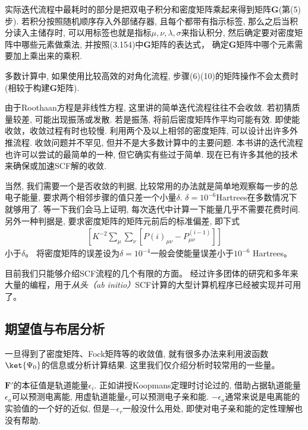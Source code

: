 实际迭代流程中最耗时的部分是把双电子积分和密度矩阵乘起来得到矩阵$\mathbf{G}$(第(5)步). 
若积分按照随机顺序存入外部储存器, 
且每个都带有指示标签, 
那么之后当积分读入主储存时, 
可以用标签也就是指标$\mu,\nu,\lambda,\sigma$来指认积分, 
然后确定要对密度矩阵中哪些元素做乘法, 
并按照(3.154)中$\mathbf{G}$矩阵的表达式， 
确定$\mathbf{G}$矩阵中哪个元素需要加上乘出来的乘积.


多数计算中, 
如果使用比较高效的对角化流程, 
步骤(6)(10)的矩阵操作不会太费时(相较于构建$\mathbf{G}$矩阵).


由于Roothaan方程是非线性方程, 
这里讲的简单迭代流程往往不会收敛. 
若初猜质量较差, 
可能出现振荡或发散. 
若是振荡, 
将前后密度矩阵作平均可能有效. 
即使能收敛，收敛过程有时也较慢. 
利用两个及以上相邻的密度矩阵, 
可以设计出许多外推流程. 
收敛问题并不罕见, 
但并不是大多数计算中的主要问题. 
本书讲的迭代流程也许可以尝试的最简单的一种, 
但它确实有些过于简单. 
现在已有许多其他的技术来确保或加速SCF解的收敛.


当然, 
我们需要一个是否收敛的判据, 
比较常用的办法就是简单地观察每一步的总电子能量, 
要求两个相邻步骤的值只差一个小量$\delta$. 
$\delta=10^{-6}$Hartrees在多数情况下就够用了. 
等一下我们会马上证明, 
每次迭代中计算一下能量几乎不需要花费时间. 
另外一种判据是, 
要求密度矩阵的矩阵元前后的标准偏差, 
即下式
\begin{align*}
	\left[ K^{-2}\sum_\mu\sum_\nu[P{(i)}_{\mu\nu}-P^{(i-1)}_{\mu\nu} ] \right]
\end{align*} 
小于$\delta$。
将密度矩阵的误差设为$\delta=10^{-4}$一般会使能量误差小于$10^{-6}$ Hartrees。


目前我们只能够介绍SCF流程的几个有限的方面。 
经过许多团体的研究和多年来大量的编程，用于\emph{从头（ab initio）}SCF计算的大型计算机程序已经被实现并可用了。 

\subsection{期望值与布居分析}
一旦得到了密度矩阵、Fock矩阵等的收敛值, 
就有很多办法来利用波函数$\ket{\Psi_0}$的信息或分析计算结果. 
这里我们仅介绍分析时较常用的一些量。


$\mathbf{F'}$的本征值是轨道能量$\epsilon_i$. 
正如讲授Koopmans定理时讨论过的, 借助占据轨道能量$\epsilon_a$可以预测电离能, 用虚轨道能量$\epsilon_r$可以预测电子亲和能. $-\epsilon_a$通常来说是电离能的实验值的一个好的近似, 但是$-\epsilon_r$一般没什么用处, 即使对电子亲和能的定性理解也没有帮助.

